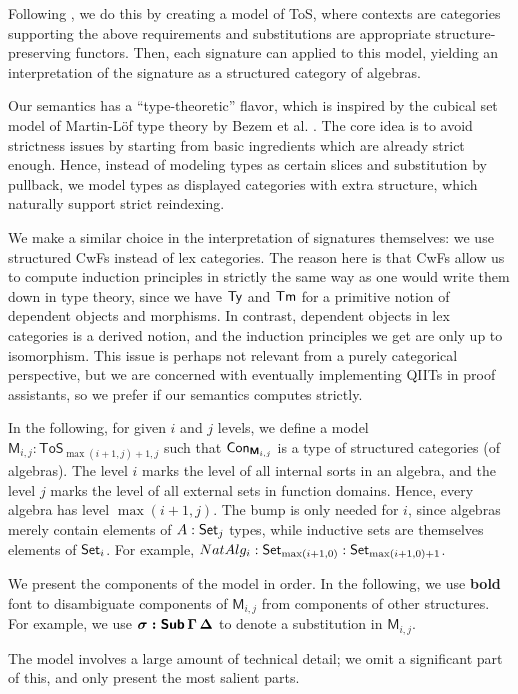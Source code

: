 \documentclass[sigplan,review,anonymous]{acmart}\settopmatter{printfolios=true,printccs=false,printacmref=false}
\newcommand{\ToS}{\mathsf{ToS}}
\newcommand{\bM}{\boldsymbol{\mathsf{M}}}
\begin{document}
Following \cite{kaposi2019constructing}, we do this by creating a model of ToS,
where contexts are categories supporting the above requirements and
substitutions are appropriate structure-preserving functors. Then, each
signature can applied to this model, yielding an interpretation of the signature
as a structured category of algebras.

Our semantics has a ``type-theoretic'' flavor, which is inspired by the cubical
set model of Martin-Löf type theory by Bezem et al. \cite{cubical}. The core idea
is to avoid strictness issues by starting from basic ingredients which are already
strict enough. Hence, instead of modeling types as certain slices and
substitution by pullback, we model types as displayed categories with extra
structure, which naturally support strict reindexing.

We make a similar choice in the interpretation of signatures themselves: we use
structured CwFs instead of lex categories. The reason here is that CwFs allow us
to compute induction principles in strictly the same way as one would write them
down in type theory, since we have $\mathsf{Ty}$ and $\mathsf{Tm}$ for a primitive notion of
dependent objects and morphisms. In contrast, dependent objects in lex
categories is a derived notion, and the induction principles we get are only up
to isomorphism. This issue is perhaps not relevant from a purely categorical
perspective, but we are concerned with eventually implementing QIITs in proof
assistants, so we prefer if our semantics computes strictly.

In the following, for given $i$ and $j$ levels, we define a model $\bM_{i,j} :
\ToS_{\max(i+1,j)+1, j}$ such that $\Con_{\bM_{i,j}}$ is a type of structured
categories (of algebras). The level $i$ marks the level of all internal sorts in
an algebra, and the level $j$ marks the level of all external sets in function
domains. Hence, every algebra has level $\max(i+1,j)$. The bump is only needed
for $i$, since algebras merely contain elements of $A : \mathsf{Set}_j$ types, while
inductive sets are themselves elements of $\mathsf{Set}_i$. For example, $NatAlg_i :
\mathsf{Set}_{\max(i+1,0)} : \mathsf{Set}_{\max(i+1, 0)+1}$.


We present the components of the model in order. In the following, we use
\textbf{bold} font to disambiguate components of $\bM_{i,j}$ from components of other
structures. For example, we use $\boldsymbol{\sigma : \mathsf{Sub}\,\Gamma\,\Delta}$ to
denote a substitution in $\bM_{i,j}$.

The model involves a large amount of technical detail; we omit a significant
part of this, and only present the most salient parts.
\end{document}
